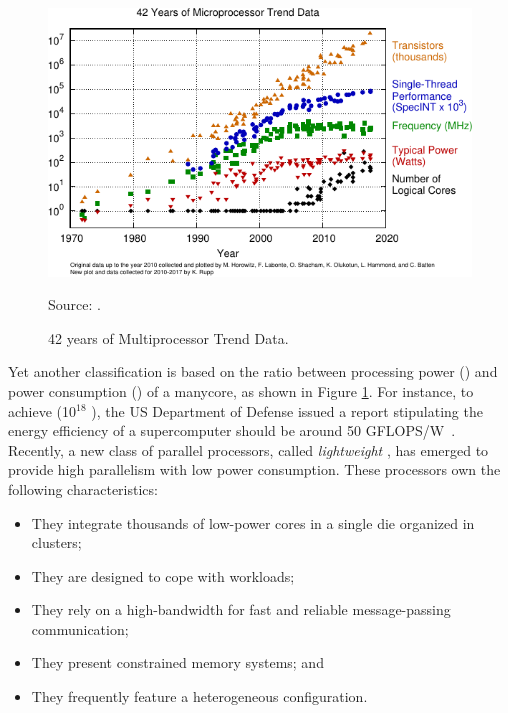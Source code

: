 	\begin{figure}[t]
		\centering
		\caption{42 years of Multiprocessor Trend Data.}
		
		\includegraphics[width=.85\textwidth]{images/42-years-processor-trend.pdf}

		Source: \cite{url:microprocessor-trend-data}.

		\label{fig.microprocessor-data}
	\end{figure}

	Yet another classification is based on the ratio between processing power (\flops)
	and power consumption (\watts) of a manycore, as shown in Figure \ref{fig.microprocessor-data}.
	For instance, to achieve \exascale (10$^{18}$ \flops), the US Department of Defense
	issued a report stipulating the energy efficiency of a supercomputer should be
	around 50 GFLOPS/W~\cite{darpa:exascale}.
	Recently, a new class of parallel processors, called \textit{lightweight} \manycores,
	has emerged to provide high parallelism with low power consumption.
	These processors own the following characteristics:

	\begin{itemize}
		\item They integrate thousands of low-power cores in a single die organized in clusters;
		\item They are designed to cope with \mimd workloads;
		\item They rely on a high-bandwidth \noc for fast and reliable message-passing communication;
		\item They present constrained memory systems; and
		\item They frequently feature a heterogeneous configuration.
	\end{itemize}

